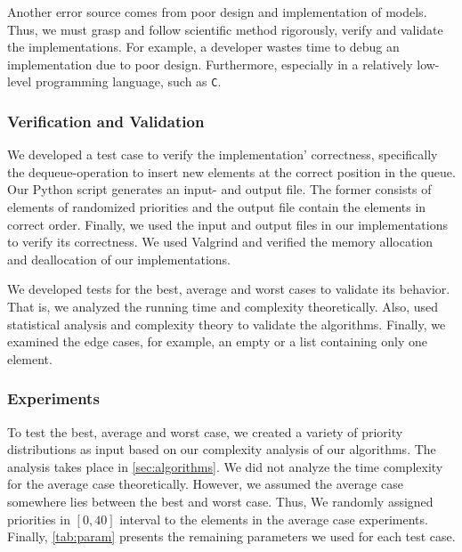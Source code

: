 \documentclass[a4paper,11pt]{kth-mag}
\newcommand*{\skippara}{\par\vspace{\baselineskip} \noindent}
\begin{document}
\marginnote{}
\skippara Another error source comes from poor design and implementation of models.
Thus, we must grasp and follow scientific method rigorously, verify and validate the implementations.
For example, a developer wastes time to debug an implementation due to poor design.
Furthermore, especially in a relatively low-level programming language, such as \texttt{C}.

\subsubsection{Verification and Validation}
We developed a test case to verify the implementation' correctness, specifically the dequeue-operation to insert new elements at the correct position in the queue.
Our Python script generates an input- and output file.
The former consists of elements of randomized priorities and the output file contain the elements in correct order.
Finally, we used the input and output files in our implementations to verify its correctness.
We used Valgrind and verified the memory allocation and deallocation of our implementations.

\skippara We developed tests for the best, average and worst cases to validate its behavior.
That is, we analyzed the running time and complexity theoretically.
Also, used statistical analysis and complexity theory to validate the algorithms.
Finally, we examined the edge cases, for example, an empty or a list containing only one element.

\clearpage
\subsubsection{Experiments}
\skippara To test the best, average and worst case, we created a variety of priority distributions as input based on our complexity analysis of our algorithms. The analysis takes place in \cref{sec:algorithms}.
We did not analyze the time complexity for the average case theoretically.
However, we assumed the average case somewhere lies between the best and worst case.
Thus, We randomly assigned priorities in $[0, 40]$ interval to the elements in the average case experiments.
Finally, \cref{tab:param} presents the remaining parameters we used for each test case.
\end{document}
